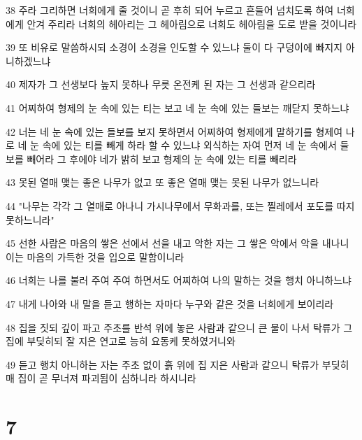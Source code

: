 \par 38 주라 그리하면 너희에게 줄 것이니 곧 후히 되어 누르고 흔들어 넘치도록 하여 너희에게 안겨 주리라 너희의 헤아리는 그 헤아림으로 너희도 헤아림을 도로 받을 것이니라
\par 39 또 비유로 말씀하시되 소경이 소경을 인도할 수 있느냐 둘이 다 구덩이에 빠지지 아니하겠느냐
\par 40 제자가 그 선생보다 높지 못하나 무릇 온전케 된 자는 그 선생과 같으리라
\par 41 어찌하여 형제의 눈 속에 있는 티는 보고 네 눈 속에 있는 들보는 깨닫지 못하느냐
\par 42 너는 네 눈 속에 있는 들보를 보지 못하면서 어찌하여 형제에게 말하기를 형제여 나로 네 눈 속에 있는 티를 빼게 하라 할 수 있느냐 외식하는 자여 먼저 네 눈 속에서 들보를 빼어라 그 후에야 네가 밝히 보고 형제의 눈 속에 있는 티를 빼리라
\par 43 못된 열매 맺는 좋은 나무가 없고 또 좋은 열매 맺는 못된 나무가 없느니라
\par 44 "나무는 각각 그 열매로 아나니 가시나무에서 무화과를, 또는 찔레에서 포도를 따지 못하느니라"
\par 45 선한 사람은 마음의 쌓은 선에서 선을 내고 악한 자는 그 쌓은 악에서 악을 내나니 이는 마음의 가득한 것을 입으로 말함이니라
\par 46 너희는 나를 불러 주여 주여 하면서도 어찌하여 나의 말하는 것을 행치 아니하느냐
\par 47 내게 나아와 내 말을 듣고 행하는 자마다 누구와 같은 것을 너희에게 보이리라
\par 48 집을 짓되 깊이 파고 주초를 반석 위에 놓은 사람과 같으니 큰 물이 나서 탁류가 그 집에 부딪히되 잘 지은 연고로 능히 요동케 못하였거니와
\par 49 듣고 행치 아니하는 자는 주초 없이 흙 위에 집 지은 사람과 같으니 탁류가 부딪히매 집이 곧 무너져 파괴됨이 심하니라 하시니라

\chapter{7}

